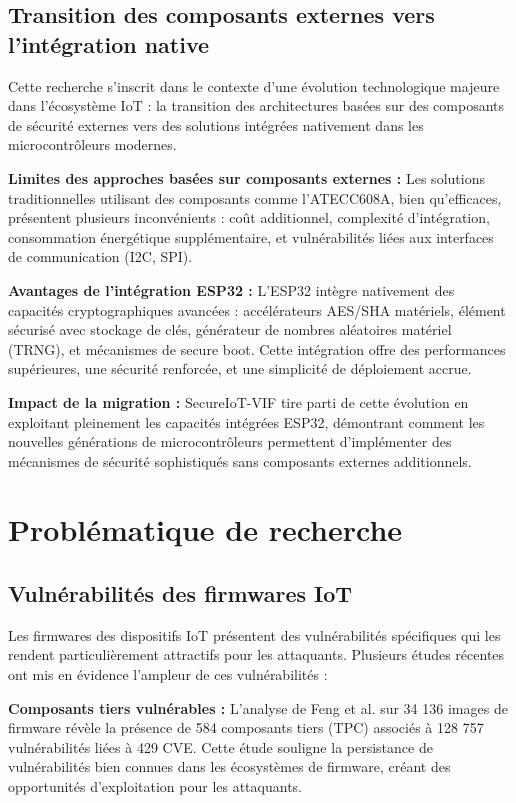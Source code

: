 \subsection{Transition des composants externes vers l'intégration native}

Cette recherche s'inscrit dans le contexte d'une évolution technologique majeure dans l'écosystème IoT : la transition des architectures basées sur des composants de sécurité externes vers des solutions intégrées nativement dans les microcontrôleurs modernes.

\textbf{Limites des approches basées sur composants externes :} Les solutions traditionnelles utilisant des composants comme l'ATECC608A, bien qu'efficaces, présentent plusieurs inconvénients : coût additionnel, complexité d'intégration, consommation énergétique supplémentaire, et vulnérabilités liées aux interfaces de communication (I2C, SPI).

\textbf{Avantages de l'intégration ESP32 :} L'ESP32 intègre nativement des capacités cryptographiques avancées : accélérateurs AES/SHA matériels, élément sécurisé avec stockage de clés, générateur de nombres aléatoires matériel (TRNG), et mécanismes de secure boot. Cette intégration offre des performances supérieures, une sécurité renforcée, et une simplicité de déploiement accrue.

\textbf{Impact de la migration :} SecureIoT-VIF tire parti de cette évolution en exploitant pleinement les capacités intégrées ESP32, démontrant comment les nouvelles générations de microcontrôleurs permettent d'implémenter des mécanismes de sécurité sophistiqués sans composants externes additionnels.

\section{Problématique de recherche}

\subsection{Vulnérabilités des firmwares IoT}

Les firmwares des dispositifs \ac{IoT} présentent des vulnérabilités spécifiques qui les rendent particulièrement attractifs pour les attaquants. Plusieurs études récentes ont mis en évidence l'ampleur de ces vulnérabilités :

\textbf{Composants tiers vulnérables :} L'analyse de Feng et al. \cite{Feng2022OneBadApple} sur 34 136 images de firmware révèle la présence de 584 composants tiers (\ac{TPC}) associés à 128 757 vulnérabilités liées à 429 \ac{CVE}. Cette étude souligne la persistance de vulnérabilités bien connues dans les écosystèmes de firmware, créant des opportunités d'exploitation pour les attaquants.


